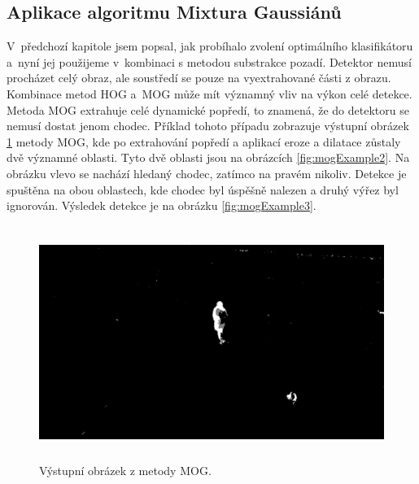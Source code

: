 \subsection{Aplikace algoritmu Mixtura Gaussiánů}
V~předchozí kapitole jsem popsal, jak probíhalo zvolení optimálního klasifikátoru a~nyní jej použijeme v~kombinaci s metodou substrakce pozadí.
Detektor nemusí procházet celý obraz, ale soustředí se pouze na vyextrahované části z obrazu. Kombinace metod HOG a~MOG může mít významný vliv na výkon celé detekce. Metoda MOG extrahuje celé dynamické popředí, to znamená, že do detektoru se nemusí dostat jenom chodec. Příklad tohoto případu zobrazuje výstupní obrázek \ref{fig:mogExample1} metody MOG, kde po extrahování popředí a aplikací eroze a dilatace zůstaly dvě významné oblasti. Tyto dvě oblasti jsou na obrázcích \ref{fig:mogExample2}. Na obrázku vlevo se nachází hledaný chodec, zatímco na pravém nikoliv. Detekce je spuštěna na obou oblastech, kde chodec byl úspěšně nalezen a druhý výřez byl ignorován. Výsledek detekce je na obrázku \ref{fig:mogExample3}.
\begin{figure}[H]
\centering
\includegraphics[keepaspectratio, max height=7.6cm,]{figures/mog/mog}%
\caption{Výstupní obrázek z metody MOG.}
\label{fig:mogExample1}
\end{figure}
